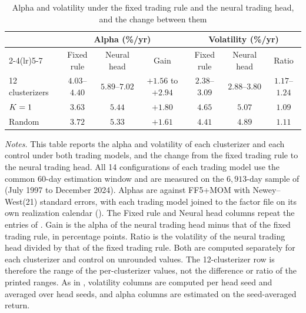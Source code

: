 \begin{table}[tb]
\centering
\caption{Alpha and volatility under the fixed trading rule and the neural trading head, and the change between them}
\label{tab:head_adds}
\begin{threeparttable}
\small
\begin{tabular}{@{}lcccccc@{}}
\toprule
& \multicolumn{3}{c}{Alpha (\%/yr)} & \multicolumn{3}{c}{Volatility (\%/yr)} \\
\cmidrule(lr){2-4}\cmidrule(lr){5-7}
& Fixed rule & Neural head & Gain & Fixed rule & Neural head & Ratio \\
\midrule
12 clusterizers & $4.03$--$4.40$ & $5.89$--$7.02$ & $+1.56$ to $+2.94$ & $2.38$--$3.09$ & $2.88$--$3.80$ & $1.17$--$1.24$ \\
$K=1$ & $3.63$ & $5.44$ & $+1.80$ & $4.65$ & $5.07$ & $1.09$ \\
Random & $3.72$ & $5.33$ & $+1.61$ & $4.41$ & $4.89$ & $1.11$ \\
\bottomrule
\end{tabular}
\begin{tablenotes}[flushleft]\small
\item \emph{Notes.} This table reports the alpha and volatility of each clusterizer and each control under both trading models, and the change from the fixed trading rule to the neural trading head. All 14 configurations of each trading model use the common 60-day estimation window and are measured on the $6{,}913$-day sample of  (July 1997 to December 2024). Alphas are against FF5+MOM with Newey--West(21) standard errors, with each trading model joined to the factor file on its own realization calendar (). The Fixed rule and Neural head columns repeat the entries of . Gain is the alpha of the neural trading head minus that of the fixed trading rule, in percentage points. Ratio is the volatility of the neural trading head divided by that of the fixed trading rule. Both are computed separately for each clusterizer and control on unrounded values. The 12-clusterizer row is therefore the range of the per-clusterizer values, not the difference or ratio of the printed ranges. As in , volatility columns are computed per head seed and averaged over head seeds, and alpha columns are estimated on the seed-averaged return. 
\end{tablenotes}
\end{threeparttable}
\end{table}




